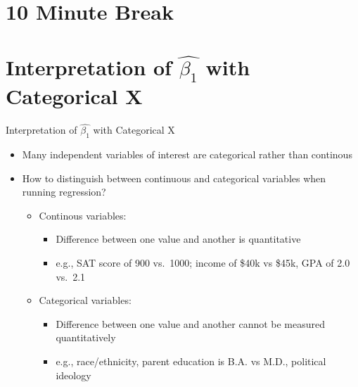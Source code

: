 \documentclass[
  8pt,
  ignorenonframetext,
  dvipsnames]{beamer}
\providecommand{\tightlist}{%
  \setlength{\itemsep}{0pt}\setlength{\parskip}{0pt}}
\let\olditem\item
\renewcommand{\item}{%
  \olditem\vspace{4pt}
}
\begin{document}
\hypertarget{minute-break}{%
\section{10 Minute Break}\label{minute-break}}

\hypertarget{interpretation-of-hatbeta_1-with-categorical-x}{%
\section{\texorpdfstring{Interpretation of \(\hat{\beta_1}\) with
Categorical
X}{Interpretation of \textbackslash hat\{\textbackslash beta\_1\} with Categorical X}}\label{interpretation-of-hatbeta_1-with-categorical-x}}

\begin{frame}{Interpretation of \(\hat{\beta_1}\) with Categorical X}
\protect\hypertarget{interpretation-of-hatbeta_1-with-categorical-x-1}{}

\begin{itemize}
\item
  Many independent variables of interest are categorical rather than
  continous
\item
  How to distinguish between continuous and categorical variables when
  running regression?

  \begin{itemize}
  \tightlist
  \item
    Continous variables:

    \begin{itemize}
    \tightlist
    \item
      Difference between one value and another is quantitative
    \item
      e.g., SAT score of 900 vs.~1000; income of \$40k vs \$45k, GPA of
      2.0 vs.~2.1
    \end{itemize}
  \item
    Categorical variables:

    \begin{itemize}
    \tightlist
    \item
      Difference between one value and another cannot be measured
      quantitatively
    \item
      e.g., race/ethnicity, parent education is B.A. vs M.D., political
      ideology
    \end{itemize}
  \end{itemize}
\end{itemize}

\medskip


\end{frame}
\end{document}
